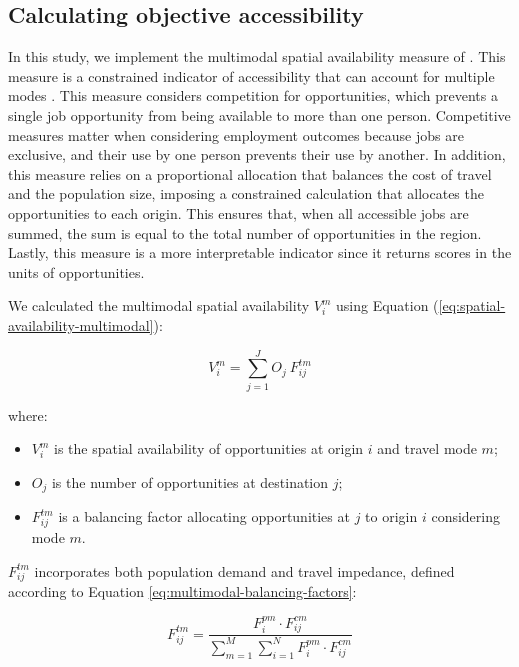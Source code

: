 \documentclass[preprint, 3p,
authoryear]{elsarticle} %
\providecommand{\tightlist}{%
  \setlength{\itemsep}{0pt}\setlength{\parskip}{0pt}}
\begin{document}
\subsection{Calculating objective
accessibility}\label{calculating-objective-accessibility}

In this study, we implement the multimodal spatial availability measure
of \citet{soukhov2024}. This measure is a constrained indicator of
accessibility that can account for multiple modes
\citep[see][]{soukhov2023, soukhov2025}. This measure considers
competition for opportunities, which prevents a single job opportunity
from being available to more than one person. Competitive measures
matter when considering employment outcomes because jobs are exclusive,
and their use by one person prevents their use by another. In addition,
this measure relies on a proportional allocation that balances the cost
of travel and the population size, imposing a constrained calculation
that allocates the opportunities to each origin. This ensures that, when
all accessible jobs are summed, the sum is equal to the total number of
opportunities in the region. Lastly, this measure is a more
interpretable indicator since it returns scores in the units of
opportunities.

We calculated the multimodal spatial availability \(V_i^m\) using
Equation (\ref{eq:spatial-availability-multimodal}):

\begin{equation}
\label{eq:spatial-availability-multimodal}
V^m_{i} = \sum_{j=1}^J O_j\ F^{tm}_{ij}
\end{equation}

where:

\begin{itemize}
\tightlist
\item
  \(V^m_{i}\) is the spatial availability of opportunities at origin
  \(i\) and travel mode \(m\);
\item
  \(O_j\) is the number of opportunities at destination \(j\);
\item
  \(F^{tm}_{ij}\) is a balancing factor allocating opportunities at
  \(j\) to origin \(i\) considering mode \(m\).
\end{itemize}

\(F^{tm}_{ij}\) incorporates both population demand and travel
impedance, defined according to Equation
\ref{eq:multimodal-balancing-factors}:

\begin{equation}
\label{eq:multimodal-balancing-factors}
F^{tm}_{ij} = \frac{F^{pm}_{i} \cdot F^{cm}_{ij}}{\sum_{m=1}^M \sum_{i=1}^N F^{pm}_{i} \cdot F^{cm}_{ij}}
\end{equation}
\end{document}
